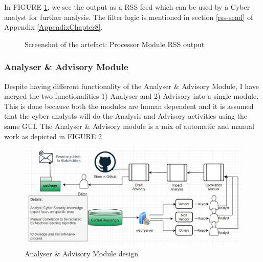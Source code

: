 In FIGURE \ref{fig:processor-rss}, we see the output as a RSS feed which can be used by a Cyber analyst for further analysis. The filter logic is mentioned in section \ref{rss-send} of Appendix \ref{AppendixChapter8}.

\begin{figure}[ht]
    \centering
    \caption{Screenshot of the artefact: Processor Module RSS output}
    \label{fig:processor-rss}
\end{figure}
 \FloatBarrier
\subsubsection{Analyser \& Advisory Module}
Despite having different functionality of the Analyser \& Advisory Module, I have merged the two functionalities 1) Analyser and 2) Advisory into a single module. This is done because both the modules are human dependent and it is assumed that the cyber analysts will do the Analysis and Advisory activities using the same GUI. The Analyser \& Advisory module is a mix of automatic and manual work as depicted in  FIGURE \ref{fig:analyser-advisor}

\begin{figure}[ht]
    \centering
    \includegraphics[width=1\linewidth]{Figures/analyser-advisor.png}
    \caption{Analyser \& Advisory Module design}
    \label{fig:analyser-advisor}
\end{figure}
 \FloatBarrier
 
